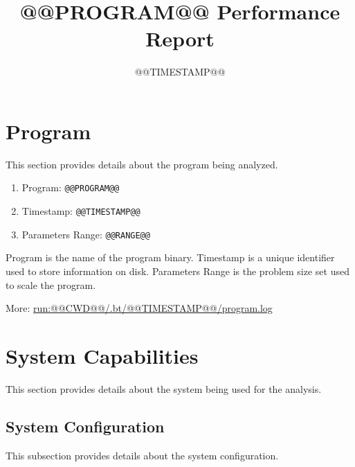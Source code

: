 \documentclass[a4paper]{article}
\begin{document}
\title{@@PROGRAM@@ Performance Report}

\date{@@TIMESTAMP@@}
\author{}

\maketitle


\tableofcontents

\section{Program}

This section provides details about the program being analyzed.

\begin{enumerate}
\item Program: {\tt @@PROGRAM@@}
\item Timestamp: {\tt @@TIMESTAMP@@}
\item Parameters Range: {\tt @@RANGE@@}
\end{enumerate}

Program is the name of the program binary.
Timestamp is a unique identifier used to store information on disk.
Parameters Range is the problem size set used to scale the program. 

More: \url{run:@@CWD@@/.bt/@@TIMESTAMP@@/program.log}

\section{System Capabilities}

This section provides details about the system being used for the analysis.

\subsection{System Configuration}

This subsection provides details about the system configuration.
\end{document}
